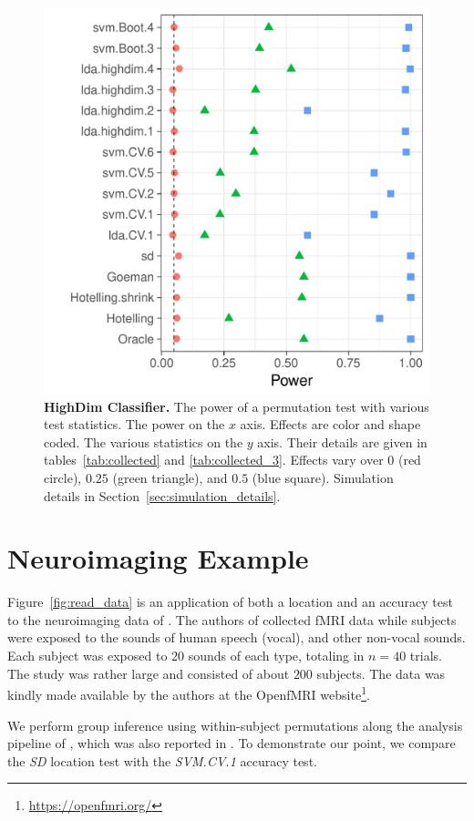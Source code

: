 \documentclass[12pt,a4paper]{article}
\begin{document}
\begin{figure}[ht]
	\centering
	\includegraphics[width=0.5\linewidth]{"art/file14"}
	\caption{
		\textbf{HighDim Classifier.} 
		The power of a permutation test with various test statistics. 
		The power on the $x$ axis. 
		Effects are color and shape coded. 
		The various statistics on the $y$ axis. 
		Their details are given in tables~\ref{tab:collected} and \ref{tab:collected_3}. 
		Effects vary over $0$ (red circle), $0.25$ (green triangle), and $0.5$ (blue square). 
		Simulation details in Section~\ref{sec:simulation_details}.
	} 
	\label{fig:highdim}
\end{figure}








\section{Neuroimaging Example}
\label{sec:example}

Figure~\ref{fig:read_data} is an application of both a location and an accuracy test to the neuroimaging data of \cite{pernet_human_2015}. 
The authors of \cite{pernet_human_2015} collected fMRI data while subjects were exposed to the sounds of human speech (vocal), and other non-vocal sounds. 
Each subject was exposed to $20$ sounds of each type, totaling in $n=40$ trials.
The study was rather large and consisted of about $200$ subjects.
The data was kindly made available by the authors at the OpenfMRI website\footnote{\url{https://openfmri.org/}}.

We perform group inference using within-subject permutations along the analysis pipeline of \cite{stelzer_statistical_2013}, which was also reported in \cite{gilron_quantifying_2016}. 
To demonstrate our point, we compare the \emph{SD} location test with the \emph{SVM.CV.1} accuracy test. 
\end{document}
